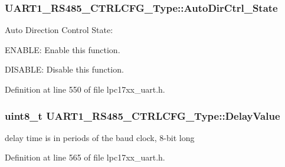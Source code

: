 \hypertarget{struct_u_a_r_t1___r_s485___c_t_r_l_c_f_g___type_a6596686b19bae7e391c53cba9299a983}{
\subsubsection[{\-Auto\-Dir\-Ctrl\-\_\-\-State}]{ {\bf \-U\-A\-R\-T1\-\_\-\-R\-S485\-\_\-\-C\-T\-R\-L\-C\-F\-G\-\_\-\-Type\-::\-Auto\-Dir\-Ctrl\-\_\-\-State}}}\label{struct_u_a_r_t1___r_s485___c_t_r_l_c_f_g___type_a6596686b19bae7e391c53cba9299a983}
\-Auto \-Direction \-Control \-State\-:
\begin{DoxyItemize}
\item \-E\-N\-A\-B\-L\-E\-: \-Enable this function.
\item \-D\-I\-S\-A\-B\-L\-E\-: \-Disable this function. 
\end{DoxyItemize}

\-Definition at line 550 of file lpc17xx\-\_\-uart.\-h.

\hypertarget{struct_u_a_r_t1___r_s485___c_t_r_l_c_f_g___type_accdbb998ed22a2ba62ba6ed131dbae16}{
\subsubsection[{\-Delay\-Value}]{\setlength{\rightskip}{0pt plus 5cm}uint8\-\_\-t {\bf \-U\-A\-R\-T1\-\_\-\-R\-S485\-\_\-\-C\-T\-R\-L\-C\-F\-G\-\_\-\-Type\-::\-Delay\-Value}}}\label{struct_u_a_r_t1___r_s485___c_t_r_l_c_f_g___type_accdbb998ed22a2ba62ba6ed131dbae16}
delay time is in periods of the baud clock, 8-\/bit long 

\-Definition at line 565 of file lpc17xx\-\_\-uart.\-h.

